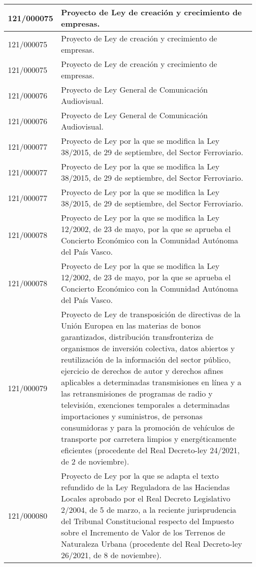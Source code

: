 {\begin{table}[H]
\begin{center}
\begin{tabularx}{\linewidth}{| l | X |}
\hline
121/000075 & Proyecto de Ley de creación y crecimiento de empresas. \\
\hline
121/000075 & Proyecto de Ley de creación y crecimiento de empresas. \\
\hline
121/000075 & Proyecto de Ley de creación y crecimiento de empresas. \\
\hline
121/000076 & Proyecto de Ley General de Comunicación Audiovisual. \\
\hline
121/000076 & Proyecto de Ley General de Comunicación Audiovisual. \\
\hline
121/000077 & Proyecto de Ley por la que se modifica la Ley 38/2015, de 29 de septiembre, del Sector Ferroviario. \\
\hline
121/000077 & Proyecto de Ley por la que se modifica la Ley 38/2015, de 29 de septiembre, del Sector Ferroviario. \\
\hline
121/000077 & Proyecto de Ley por la que se modifica la Ley 38/2015, de 29 de septiembre, del Sector Ferroviario. \\
\hline
121/000078 & Proyecto de Ley por la que se modifica la Ley 12/2002, de 23 de mayo, por la que se aprueba el Concierto Económico con la Comunidad Autónoma del País Vasco. \\
\hline
121/000078 & Proyecto de Ley por la que se modifica la Ley 12/2002, de 23 de mayo, por la que se aprueba el Concierto Económico con la Comunidad Autónoma del País Vasco. \\
\hline
121/000079 & Proyecto de Ley de transposición de directivas de la Unión Europea en las materias de bonos garantizados, distribución transfronteriza de organismos de inversión colectiva, datos abiertos y reutilización de la información del sector público, ejercicio de derechos de autor y derechos afines aplicables a determinadas transmisiones en línea y a las retransmisiones de programas de radio y televisión, exenciones temporales a determinadas importaciones y suministros, de personas consumidoras y para la promoción de vehículos de transporte por carretera limpios y energéticamente eficientes (procedente del Real Decreto-ley 24/2021, de 2 de noviembre). \\
\hline
121/000080 & Proyecto de Ley por la que se adapta el texto refundido de la Ley Reguladora de las Haciendas Locales aprobado por el Real Decreto Legislativo 2/2004, de 5 de marzo, a la reciente jurisprudencia del Tribunal Constitucional respecto del Impuesto sobre el Incremento de Valor de los Terrenos de Naturaleza Urbana (procedente del Real Decreto-ley 26/2021, de 8 de noviembre). \\

\end{tabularx}
\end{center}
\end{table}}
